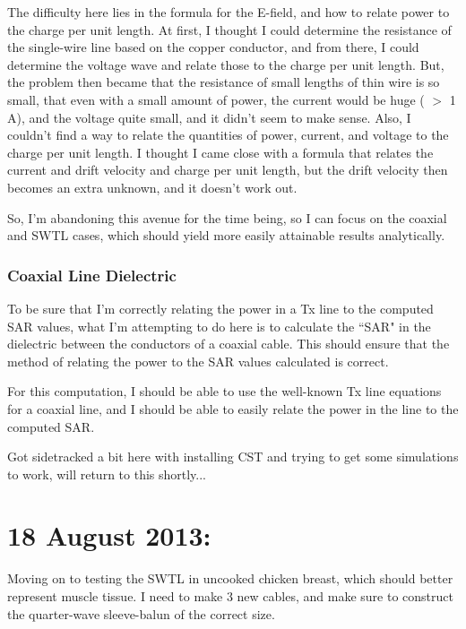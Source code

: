 \documentclass[12pt,onecolumn,titlepage]{article}
\begin{document}
The difficulty here lies in the formula for the E-field, and how to relate power to the charge per unit length. At first, I thought I could determine the resistance of the single-wire line based on the copper conductor, and from there, I could determine the voltage wave and relate those to the charge per unit length. But, the problem then became that the resistance of small lengths of thin wire is so small, that even with a small amount of power, the current would be huge ( $>$ 1 A), and the voltage quite small, and it didn't seem to make sense. Also, I couldn't find a way to relate the quantities of power, current, and voltage to the charge per unit length. I thought I came close with a formula that relates the current and drift velocity and charge per unit length, but the drift velocity then becomes an extra unknown, and it doesn't work out. 

So, I'm abandoning this avenue for the time being, so I can focus on the coaxial and SWTL cases, which should yield more easily attainable results analytically.



\subsubsection{Coaxial Line Dielectric}
\indent \indent To be sure that I'm correctly relating the power in a Tx line to the computed SAR values, what I'm attempting to do here is to calculate the ``SAR" in the dielectric between the conductors of a coaxial cable. This should ensure that the method of relating the power to the SAR values calculated is correct.

For this computation, I should be able to use the well-known Tx line equations for a coaxial line, and I should be able to easily relate the power in the line to the computed SAR. 

Got sidetracked a bit here with installing CST and trying to get some simulations to work, will return to this shortly...




\clearpage
\section{18 August 2013:}

\indent \indent Moving on to testing the SWTL in uncooked chicken breast, which should better represent muscle tissue. I need to make 3 new cables, and make sure to construct the quarter-wave sleeve-balun of the correct size.
\end{document}
